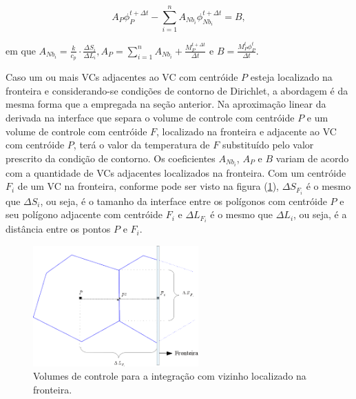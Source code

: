 \begin{equation}
 A_{P} \phi_{P}^{t+ \Delta t} - \sum_{i=1}^{n} A_{Nb_{i}} \phi_{Nb_{i}}^{t+ \Delta t} = B,
 \label{equacao_discretizacao_pologono_voronoi} 
\end{equation}

\noindent em que $A_{Nb_{i}} =  \frac{k} {c_{p}}  \cdot \frac {\Delta S_{i}} {\Delta L_{i}},  A_{P} = \sum_{i=1}^{n} A_{Nb_{i}} + \frac { M_{P}^{t+ \Delta t} } { \Delta t}$ e $B = \frac {M_{P}^{t} \phi_{P}^{t}} { \Delta t}.$

Caso um ou mais VCs adjacentes ao VC com centróide $P$ esteja localizado na fronteira e considerando-se condições de contorno de Dirichlet, a abordagem é da mesma forma que a empregada na seção anterior. Na aproximação linear da derivada na interface que separa o volume de controle com centróide $P$ e um volume de controle com centróide $F$, localizado na fronteira e adjacente ao VC com centróide $P$, terá o valor da temperatura de $F$ substituído pelo valor prescrito da condição de contorno. Os coeficientes $A_{Nb_{i}}$, $A_{P}$ e $B$ variam de acordo com a quantidade de VCs adjacentes localizados na fronteira. Com um centróide $F_{i}$ de um VC na fronteira, conforme pode ser visto na figura (\ref{fig_volume_controle_integracao_fronteira}), $\Delta S_{F_{i}}$ é o mesmo que $\Delta S_{i}$, ou seja, é o tamanho da interface entre os polígonos com centróide $P$ e seu polígono adjacente com centróide $F_i$ e $\Delta L_{F_{i}}$ é o mesmo que $\Delta L_{i}$, ou seja, é a distância entre os pontos $P$ e $F_i$. 

\begin{figure}[!ht]
  \centering
  \includegraphics[width=180pt]{imagens_discretizacao/volume_controle_integracao_fronteira.png}
  \caption{\footnotesize{Volumes de controle para a integração com vizinho localizado na fronteira.
}}
  \label{fig_volume_controle_integracao_fronteira}
\end{figure}

